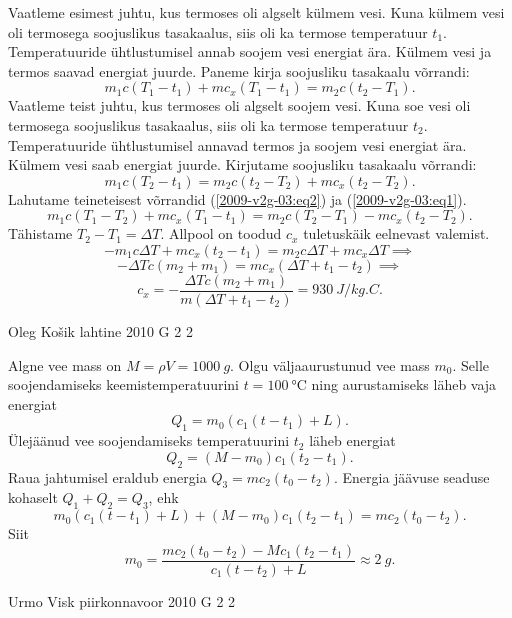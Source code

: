 \documentclass[11pt]{article}
\begin{document}
{{Vaatleme esimest juhtu, kus termoses oli algselt külmem vesi. Kuna külmem vesi oli termosega soojuslikus tasakaalus, siis oli ka termose temperatuur $t_1$. Temperatuuride
ühtlustumisel annab soojem vesi energiat ära. Külmem vesi ja termos saavad energiat juurde. Paneme kirja soojusliku tasakaalu võrrandi:
\begin{equation}
m_{1} c\left(T_{1}-t_{1}\right)+m c_{x}\left(T_{1}-t_{1}\right)=m_{2} c\left(t_{2}-T_{1}\right).
\label{2009-v2g-03:eq1}
\end{equation}
Vaatleme teist juhtu, kus termoses oli algselt soojem vesi. Kuna soe vesi oli termosega soojuslikus tasakaalus, siis oli ka termose temperatuur $t_2$. Temperatuuride
ühtlustumisel annavad termos ja soojem vesi energiat ära. Külmem vesi saab energiat juurde. Kirjutame soojusliku tasakaalu võrrandi:
\begin{equation}
m_{1} c\left(T_{2}-t_{1}\right)=m_{2} c\left(t_{2}-T_{2}\right)+m c_{x}\left(t_{2}-T_{2}\right).
\label{2009-v2g-03:eq2}
\end{equation}
Lahutame teineteisest võrrandid (\ref{2009-v2g-03:eq2}) ja (\ref{2009-v2g-03:eq1}).
\[
m_{1} c\left(T_{1}-T_{2}\right)+m c_{x}\left(T_{1}-t_{1}\right)=m_{2} c\left(T_{2}-T_{1}\right)-m c_{x}\left(t_{2}-T_{2}\right).
\]
Tähistame $T_2 - T_1 = \Delta T$. Allpool on toodud $c_x$ tuletuskäik eelnevast valemist.
\[
-m_{1} c \Delta T+m c_{x}\left(t_{2}-t_{1}\right)=m_{2} c \Delta T+m c_{x} \Delta T\implies
\]
\[
-\Delta T c\left(m_{2}+m_{1}\right)=m c_{x}\left(\Delta T+t_{1}-t_{2}\right)\implies
\]
\[
c_{x}=-\frac{\Delta T c\left(m_{2}+m_{1}\right)}{m\left(\Delta T+t_{1}-t_{2}\right)}=\SI{930}{J/kg.C}.
\]
\fi
}

{Oleg Košik} %
{lahtine} %
{2010} %
{G 2} %
{2} %
{

\ifSolution
Algne vee mass on $M=\rho V=\SI{1000}{g}$. Olgu väljaaurustunud vee mass $m_0$. Selle soojendamiseks keemistemperatuurini $t=\SI{100}{\celsius}$ ning aurustamiseks läheb vaja energiat
\[
Q_1=m_0(c_1(t-t_1)+L).
\]
Ülejäänud vee soojendamiseks temperatuurini $t_2$ läheb energiat
\[
Q_2=(M-m_0)c_1(t_2-t_1).
\]
Raua jahtumisel eraldub energia $Q_3=mc_2(t_0-t_2)$. Energia jäävuse seaduse kohaselt $Q_1+Q_2=Q_3$, ehk
\[
m_0(c_1(t-t_1)+L)+(M-m_0)c_1(t_2-t_1)=mc_2(t_0-t_2).
\]
Siit
\[
m_0=\frac{mc_2(t_0-t_2)-Mc_1(t_2-t_1)}{c_1(t-t_2)+L}\approx \SI{2}{g}.
\]
\fi
}

{Urmo Visk} %
{piirkonnavoor} %
{2010} %
{G 2} %
{2} %
{

}}
\end{document}
